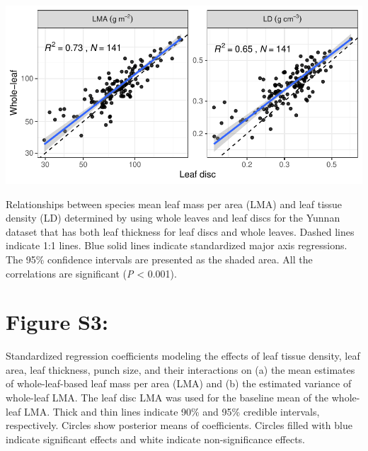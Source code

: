 \documentclass[
  12pt,
]{article}
\begin{document}
\includegraphics[width=6.25in,height=\textheight]{../figs/lma_ld.pdf}

Relationships between species mean leaf mass per area (LMA) and leaf tissue density (LD) determined by using whole leaves and leaf discs for the Yunnan dataset that has both leaf thickness for leaf discs and whole leaves.
Dashed lines indicate 1:1 lines.
Blue solid lines indicate standardized major axis regressions.
The 95\% confidence intervals are presented as the shaded area.
All the correlations are significant (\emph{P} \textless{} 0.001).

\newpage

\hypertarget{figure-s3}{%
\section{Figure S3:}\label{figure-s3}}

Standardized regression coefficients modeling the effects of leaf tissue density,
leaf area,
leaf thickness,
punch size, and
their interactions on
(a) the mean estimates of whole-leaf-based leaf mass per area (LMA) and
(b) the estimated variance of whole-leaf LMA.
The leaf disc LMA was used for the baseline mean of the whole-leaf LMA.
Thick and thin lines indicate 90\% and 95\% credible intervals, respectively.
Circles show posterior means of coefficients.
Circles filled with blue indicate significant effects and white indicate non-significance effects.
\end{document}
